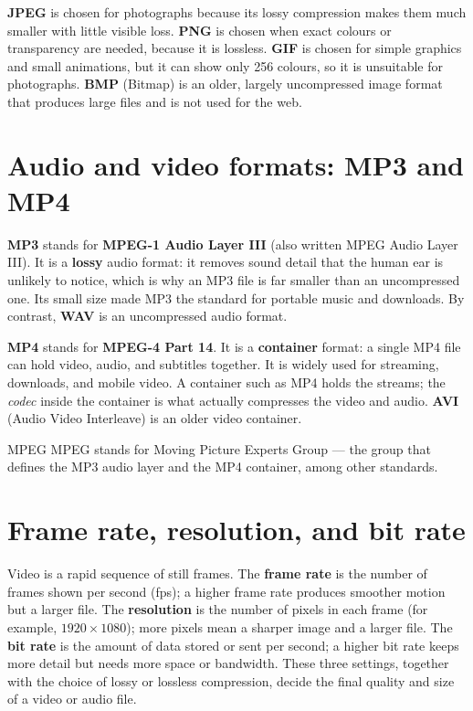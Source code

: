 \textbf{JPEG} is chosen for photographs because its lossy compression makes
them much smaller with little visible loss. \textbf{PNG} is chosen when exact
colours or transparency are needed, because it is lossless. \textbf{GIF} is
chosen for simple graphics and small animations, but it can show only 256
colours, so it is unsuitable for photographs. \textbf{BMP} (Bitmap) is an
older, largely uncompressed image format that produces large files and is not
used for the web.

\section{Audio and video formats: MP3 and MP4}
\textbf{MP3} stands for \textbf{MPEG-1 Audio Layer III} (also written MPEG
Audio Layer III). It is a \textbf{lossy} audio format: it removes sound detail
that the human ear is unlikely to notice, which is why an MP3 file is far
smaller than an uncompressed one. Its small size made MP3 the standard for
portable music and downloads. By contrast, \textbf{WAV} is an uncompressed
audio format.

\textbf{MP4} stands for \textbf{MPEG-4 Part 14}. It is a \textbf{container}
format: a single MP4 file can hold video, audio, and subtitles together. It is
widely used for streaming, downloads, and mobile video. A container such as
MP4 holds the streams; the \emph{codec} inside the container is what actually
compresses the video and audio. \textbf{AVI} (Audio Video Interleave) is an
older video container.

\begin{definitionbox}{MPEG}
MPEG stands for Moving Picture Experts Group --- the group that defines the
MP3 audio layer and the MP4 container, among other standards.
\end{definitionbox}

\section{Frame rate, resolution, and bit rate}
Video is a rapid sequence of still frames. The \textbf{frame rate} is the
number of frames shown per second (fps); a higher frame rate produces smoother
motion but a larger file. The \textbf{resolution} is the number of pixels in
each frame (for example, $1920 \times 1080$); more pixels mean a sharper image
and a larger file. The \textbf{bit rate} is the amount of data stored or sent
per second; a higher bit rate keeps more detail but needs more space or
bandwidth. These three settings, together with the choice of lossy or lossless
compression, decide the final quality and size of a video or audio file.

